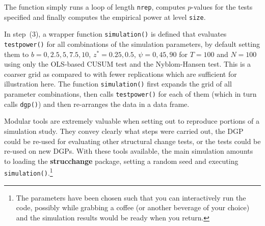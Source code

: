\documentclass[10pt,a4paper,twoside]{article}
\let\code=\texttt
\let\pkg=\textbf
\newenvironment{Schunk}{}{}
\begin{document}
The function simply runs a loop of length \code{nrep}, computes $p$-values for
the tests specified and finally computes the empirical power at level \code{size}.

In step~(3), a wrapper function \code{simulation()} is defined that
evaluates \code{testpower()} for all combinations of the simulation parameters,
by default setting them to $b = 0, 2.5, 5, 7.5, 10$, $z^* = 0.25, 0.5$, 
$\psi = 0, 45, 90$ for $T = 100$ and $N = 100$ using only the OLS-based CUSUM test 
and the Nyblom-Hansen test. This is a coarser grid as compared to \cite{repro:Ploberger+Kraemer:1992}
with fewer replications which are sufficient for illustration here. The function
\code{simulation()} first expands the grid of all parameter combinations, then
calls \code{testpower()} for each of them (which in turn calls \code{dgp()})
and then re-arranges the data in a data frame.

\begin{Schunk}
\end{Schunk}


Modular tools are extremely valuable when setting out to reproduce portions of
a simulation study. They convey clearly what steps were carried out, the DGP
could be re-used for evaluating other structural change tests, or the tests could
be re-used on new DGPs. With these tools available, the main simulation amounts to
loading the \pkg{strucchange} package, setting a random seed and executing
\code{simulation()}.\footnote{The parameters have been chosen such that you can
interactively run the code, possibly while grabbing a coffee (or another beverage of
your choice) and the simulation results would be ready when you return.}
\end{document}
